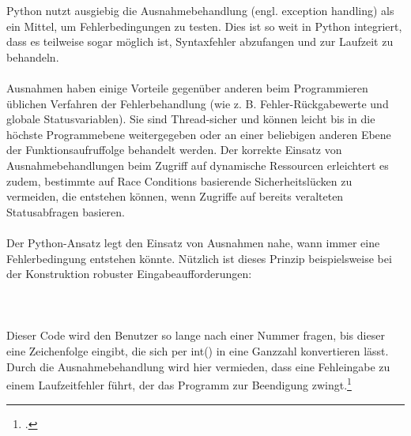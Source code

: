 Python nutzt ausgiebig die Ausnahmebehandlung (engl. exception handling) als ein Mittel, um Fehlerbedingungen zu testen. Dies ist so weit in Python integriert, dass es teilweise sogar möglich ist, Syntaxfehler abzufangen und zur Laufzeit zu behandeln.\\
\\
Ausnahmen haben einige Vorteile gegenüber anderen beim Programmieren üblichen Verfahren der Fehlerbehandlung (wie z. B. Fehler-Rückgabewerte und globale Statusvariablen). Sie sind Thread-sicher und können leicht bis in die höchste Programmebene weitergegeben oder an einer beliebigen anderen Ebene der Funktionsaufruffolge behandelt werden. Der korrekte Einsatz von Ausnahmebehandlungen beim Zugriff auf dynamische Ressourcen erleichtert es zudem, bestimmte auf Race Conditions basierende Sicherheitslücken zu vermeiden, die entstehen können, wenn Zugriffe auf bereits veralteten Statusabfragen basieren.\\
\\
Der Python-Ansatz legt den Einsatz von Ausnahmen nahe, wann immer eine Fehlerbedingung entstehen könnte. Nützlich ist dieses Prinzip beispielsweise bei der Konstruktion robuster Eingabeaufforderungen:\\
\\
\\
\\
Dieser Code wird den Benutzer so lange nach einer Nummer fragen, bis dieser eine Zeichenfolge eingibt, die sich per int() in eine Ganzzahl konvertieren lässt. Durch die Ausnahmebehandlung wird hier vermieden, dass eine Fehleingabe zu einem Laufzeitfehler führt, der das Programm zur Beendigung zwingt.\footcite{python_wiki}
